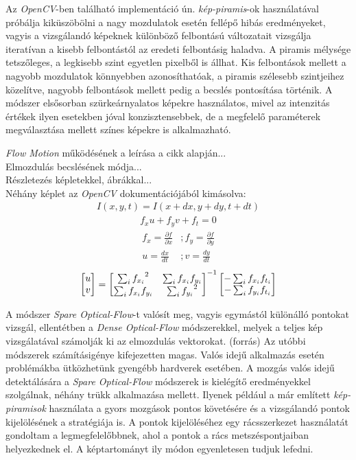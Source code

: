 Az \textit{OpenCV}-ben található implementáció ún. \textit{kép-piramis}-ok használatával próbálja kiküszöbölni a nagy mozdulatok esetén fellépő hibás eredményeket, vagyis a vizsgálandó képeknek különböző felbontású változatait vizsgálja iteratívan a kisebb felbontástól az eredeti felbontásig haladva. A piramis mélysége tetszőleges, a legkisebb szint egyetlen pixelből is állhat. Kis felbontások mellett a nagyobb mozdulatok könnyebben azonosíthatóak, a piramis szélesebb szintjeihez közelítve, nagyobb felbontások mellett pedig a becslés pontosítása történik. 
A módszer elsősorban szürkeárnyalatos képekre használatos, mivel az intenzitás értékek ilyen esetekben jóval konzisztensebbek, de a megfelelő paraméterek megválasztása mellett színes képekre is alkalmazható. \cite{bradski2008learning} 

\cite{lucas1981iterative} 
\textit{Flow Motion} működésének a leírása a cikk alapján...\\
Elmozdulás becslésének módja...\\
Részletezés képletekkel, ábrákkal...\\
Néhány képlet az \textit{OpenCV} dokumentációjából kimásolva:
\begin{align*}
I(x,y,t) = I(x+dx,y+dy,t+dt)
\end{align*}
\begin{align*}
f_xu+f_yv+f_t=0
\end{align*}
\begin{align*}
f_x = \frac{\partial f}{\partial x} &; f_y = \frac{\partial f}{\partial y}\\
u = \frac{dx}{dt} &; v = \frac{dy}{dt}
\end{align*}
\begin{align*}
\bmatrix u \\ v \endbmatrix = {\bmatrix {\sum_{i}f_{x_i}}^2 & \sum_{i}f_{x_i}f_{y_i}\\ \sum_{i}f_{x_i}f_{y_i} & {\sum_{i}f_{y_i}}^2 \endbmatrix}^{-1} \bmatrix -\sum_{i}f_{x_i}f_{t_i} \\ -\sum_{i}f_{y_i}f_{t_i} \endbmatrix
\end{align*}

A módszer \textit{Spare Optical-Flow}-t valósít meg, vagyis egymástól különálló pontokat vizsgál, ellentétben a \textit{Dense Optical-Flow} módszerekkel, melyek a teljes kép vizsgálatával számolják ki az elmozdulás vektorokat. (forrás) Az utóbbi módszerek számításigénye kifejezetten magas. Valós idejű alkalmazás esetén problémákba ütközhetünk gyengébb hardverek esetében. A mozgás valós idejű detektálására a \textit{Spare Optical-Flow} módszerek is kielégítő eredményekkel szolgálnak, néhány trükk alkalmazása mellett. Ilyenek például a már említett \textit{kép-piramisok} használata a gyors mozgások pontos követésére és a vizsgálandó pontok kijelölésének a stratégiája is. A pontok kijelöléséhez egy rácsszerkezet használatát gondoltam a legmegfelelőbbnek, ahol a pontok a rács metszéspontjaiban helyezkednek el. A képtartományt ily módon egyenletesen tudjuk lefedni.

